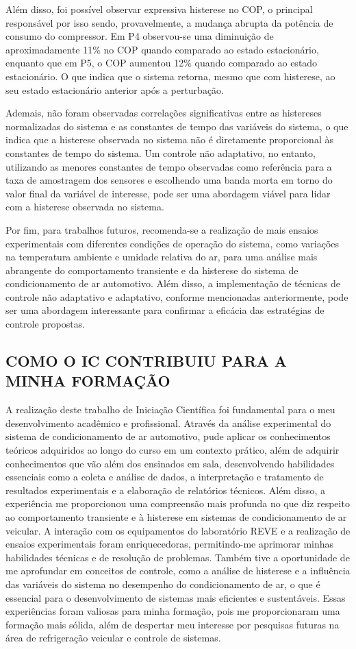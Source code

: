 Além disso, foi possível observar expressiva histerese no COP, o principal responsável por isso sendo, provavelmente, a mudança abrupta da potência de consumo do compressor. Em P4  observou-se uma diminuição de aproximadamente 11\% no COP quando comparado ao estado estacionário, enquanto que em P5, o COP aumentou 12\% quando comparado ao estado estacionário.  O que indica que o sistema retorna, mesmo que com histerese, ao seu estado estacionário anterior após a perturbação.

Ademais, não foram observadas correlações significativas entre as histereses normalizadas do sistema e as constantes de tempo das variáveis do sistema, o que indica que a histerese observada no sistema não é diretamente proporcional às constantes de tempo do sistema. Um controle não adaptativo, no entanto, utilizando as menores constantes de tempo observadas como referência para a taxa de amostragem dos sensores e escolhendo uma banda morta em torno do valor final da variável de interesse, pode ser uma abordagem viável para lidar com a histerese observada no sistema.

Por fim, para trabalhos futuros, recomenda-se a realização de mais ensaios experimentais com diferentes condições de operação do sistema, como variações na temperatura ambiente e umidade relativa do ar, para uma análise mais abrangente do comportamento transiente e da histerese do sistema de condicionamento de ar automotivo. Além disso, a implementação de técnicas de controle não adaptativo e adaptativo, conforme mencionadas anteriormente, pode ser uma abordagem interessante para confirmar a eficácia das estratégias de controle propostas.

\subsection{\MakeUppercase{ Como o IC Contribuiu para a Minha Formação}}

A realização deste trabalho de Iniciação Científica foi fundamental para o meu desenvolvimento acadêmico e profissional. Através da análise experimental do sistema de condicionamento de ar automotivo, pude aplicar os conhecimentos teóricos adquiridos ao longo do curso em um contexto prático, além de adquirir conhecimentos que vão além dos ensinados em sala, desenvolvendo habilidades essenciais como a coleta e análise de dados, a interpretação e tratamento de resultados experimentais e a elaboração de relatórios técnicos.  Além disso, a experiência me proporcionou uma compreensão mais profunda no que diz respeito ao comportamento transiente e à histerese em sistemas de condicionamento de ar veicular. A interação com os equipamentos do laboratório REVE e a realização de ensaios experimentais foram enriquecedoras, permitindo-me aprimorar minhas habilidades técnicas e de resolução de problemas. Também tive a oportunidade de me aprofundar em conceitos de controle, como a análise de histerese e a influência das variáveis do sistema no desempenho do condicionamento de ar, o que é essencial para o desenvolvimento de sistemas mais eficientes e sustentáveis.
Essas experiências foram valiosas para minha formação, pois me proporcionaram uma formação mais sólida, além de despertar meu interesse por pesquisas futuras na área de refrigeração veicular e controle de sistemas. 

